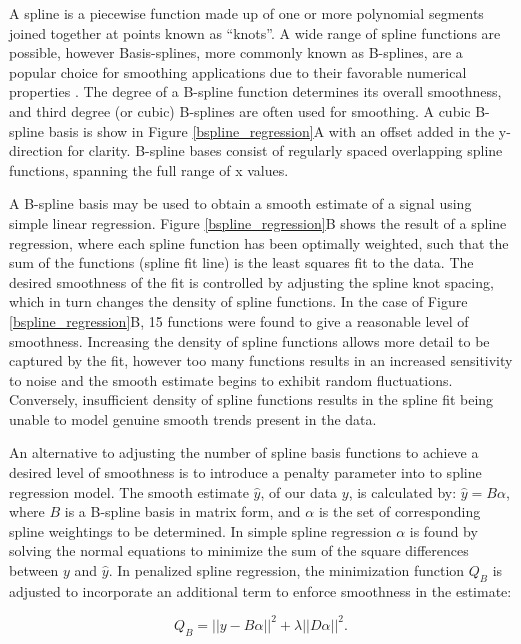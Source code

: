 \documentclass[num-refs]{wiley-article}
\begin{document}
A spline is a piecewise function made up of one or more polynomial segments joined together at points known as ``knots''. A wide range of spline functions are possible, however Basis-splines, more commonly known as B-splines, are a popular choice for smoothing applications due to their favorable numerical properties \cite{DeBoor2001}. The degree of a B-spline function determines its overall smoothness, and third degree (or cubic) B-splines are often used for smoothing. A cubic B-spline basis is show in Figure \ref{bspline_regression}A with an offset added in the y-direction for clarity. B-spline bases consist of regularly spaced overlapping spline functions, spanning the full range of x values.

A B-spline basis may be used to obtain a smooth estimate of a signal using simple linear regression. Figure \ref{bspline_regression}B shows the result of a spline regression, where each spline function has been optimally weighted, such that the sum of the functions (spline fit line) is the least squares fit to the data. The desired smoothness of the fit is controlled by adjusting the spline knot spacing, which in turn changes the density of spline functions. In the case of Figure \ref{bspline_regression}B, 15 functions were found to give a reasonable level of smoothness. Increasing the density of spline functions allows more detail to be captured by the fit, however too many functions results in an increased sensitivity to noise and the smooth estimate begins to exhibit random fluctuations. Conversely, insufficient density of spline functions results in the spline fit being unable to model genuine smooth trends present in the data.

An alternative to adjusting the number of spline basis functions to achieve a desired level of smoothness is to introduce a penalty parameter into to spline regression model. The smooth estimate $\hat{y}$, of our data $y$, is calculated by: $\hat{y} = B \alpha$, where $B$ is a B-spline basis in matrix form, and $\alpha$ is the set of corresponding spline weightings to be determined. In simple spline regression $\alpha$ is found by solving the normal equations to minimize the sum of the square differences between $y$ and $\hat{y}$. In penalized spline regression, the minimization function $Q_B$ is adjusted to incorporate an additional term to enforce smoothness in the estimate:

\begin{equation}
  Q_{B} = ||y - B \alpha ||^{2} + \lambda ||D \alpha ||^{2}.
\end{equation}
\end{document}
